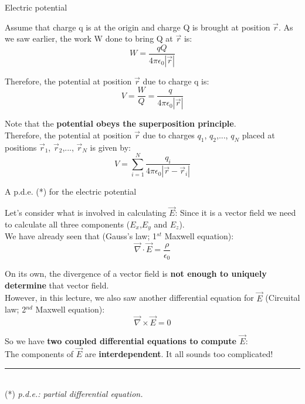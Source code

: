 %
%
%

\begin{frame}{Electric potential}

Assume that charge q is at the origin and charge Q is brought at position $\vec{r}$.
As we saw earlier, the work W done to bring Q at $\vec{r}$ is:
\begin{equation*}
   W = \frac{q Q}{4\pi\epsilon_0 |\vec{r}|}
\end{equation*}

Therefore, the potential at position $\vec{r}$ due to charge q is:
\begin{equation*}
   V = \frac{W}{Q} = \frac{q}{4\pi\epsilon_0 |\vec{r}|}
\end{equation*}

\vspace{0.2cm}

Note that the {\bf potential obeys the superposition principle}.\\
Therefore, the potential at position $\vec{r}$ due to charges $q_1$, $q_2$,..., $q_N$ placed at
positions $\vec{r}_1$, $\vec{r}_2$,..., $\vec{r}_N$ is given by:
\begin{equation*}
   V = \sum_{i=1}^{N} \frac{q_i}{4\pi\epsilon_0 |\vec{r}-\vec{r}_{i}|}
\end{equation*}

\end{frame}




%
%
%

\begin{frame}{A p.d.e. (*) for the electric potential}

Let's consider what is involved in calculating $\vec{E}$:
Since it is a vector field we need to calculate all three components
($E_x$,$E_y$ and $E_z$).\\

\vspace{0.2cm}
We have already seen that (Gauss's law; 1$^{st}$ Maxwell equation):
\begin{equation*}
  \vec{\nabla} \cdot \vec{E} = \frac{\rho}{\epsilon_0}
\end{equation*}

On its own, the divergence of a vector field is
{\bf not enough to uniquely determine} that vector field.\\
However, in this lecture, we also saw another differential equation for
$\vec{E}$ (Circuital law; 2$^{nd}$ Maxwell equation):
\begin{equation*}
  \vec{\nabla} \times \vec{E} = 0
\end{equation*}

So we have {\bf two coupled differential equations to compute $\vec{E}$}:\\
The components of $\vec{E}$ are {\bf interdependent}.
It all sounds too complicated!

\vspace{0.2cm}

\noindent\rule{2cm}{0.4pt}\\
{\scriptsize
 (*) {\it p.d.e.: partial differential equation.}
}

\end{frame}

